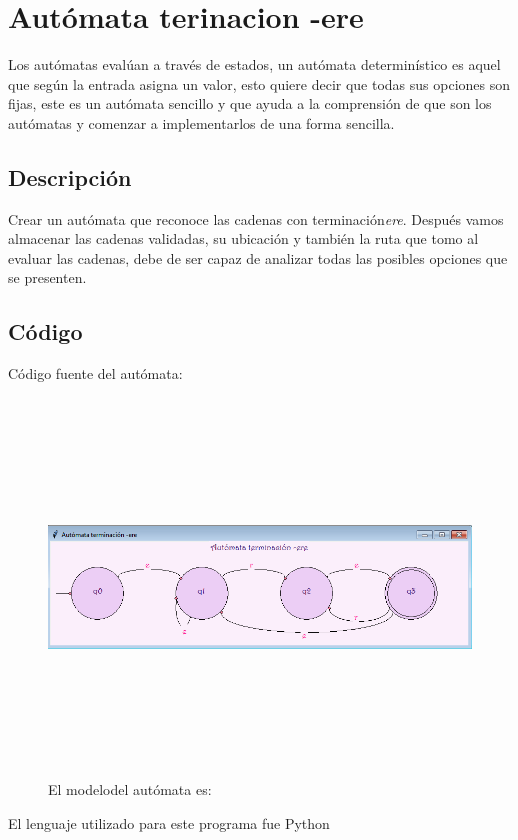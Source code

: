\documentclass[12pt]{article}
\begin{document}
\newpage
\section{Autómata terinacion -ere}
Los autómatas evalúan a través de estados, un autómata determinístico es aquel que según la entrada asigna un valor, esto quiere decir que todas sus opciones son fijas, este es un autómata sencillo y que ayuda a la comprensión de que son los autómatas y comenzar a implementarlos de una forma sencilla.

\subsection{Descripción }
Crear un autómata que reconoce las cadenas con terminación\textit{ere}. Después vamos almacenar las cadenas validadas, su ubicación y también la ruta que tomo al evaluar las cadenas, debe de ser capaz de analizar todas las posibles opciones que se presenten.

\subsection{Código}
Código fuente del autómata:

\begin{figure}[H]
\includegraphics[width=\textwidth, height=10cm]{eregrafico}
\caption{El modelodel autómata es:}
\label{fig:automata-ere}
\end{figure}

El lenguaje utilizado para este programa fue Python\\
\end{document}
